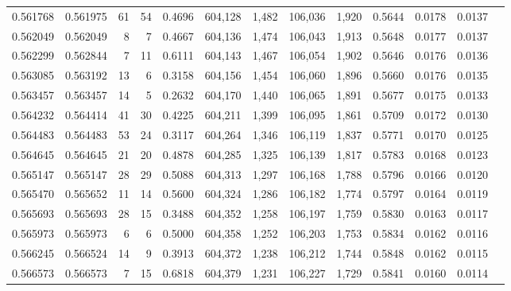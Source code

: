 \begin{tabular}{rrrrrrrrrrrrr}
0.561768 & 0.561975 &    61 &    54 &                                     0.4696 & 604,128 &   1,482 & 106,036 &   1,920 & 0.5644 & 0.0178 & 0.0137 \\
0.562049 & 0.562049 &     8 &     7 &                                     0.4667 & 604,136 &   1,474 & 106,043 &   1,913 & 0.5648 & 0.0177 & 0.0137 \\
0.562299 & 0.562844 &     7 &    11 &                                     0.6111 & 604,143 &   1,467 & 106,054 &   1,902 & 0.5646 & 0.0176 & 0.0136 \\
0.563085 & 0.563192 &    13 &     6 &                                     0.3158 & 604,156 &   1,454 & 106,060 &   1,896 & 0.5660 & 0.0176 & 0.0135 \\
0.563457 & 0.563457 &    14 &     5 &                                     0.2632 & 604,170 &   1,440 & 106,065 &   1,891 & 0.5677 & 0.0175 & 0.0133 \\
0.564232 & 0.564414 &    41 &    30 &                                     0.4225 & 604,211 &   1,399 & 106,095 &   1,861 & 0.5709 & 0.0172 & 0.0130 \\
0.564483 & 0.564483 &    53 &    24 &                                     0.3117 & 604,264 &   1,346 & 106,119 &   1,837 & 0.5771 & 0.0170 & 0.0125 \\
0.564645 & 0.564645 &    21 &    20 &                                     0.4878 & 604,285 &   1,325 & 106,139 &   1,817 & 0.5783 & 0.0168 & 0.0123 \\
0.565147 & 0.565147 &    28 &    29 &                                     0.5088 & 604,313 &   1,297 & 106,168 &   1,788 & 0.5796 & 0.0166 & 0.0120 \\
0.565470 & 0.565652 &    11 &    14 &                                     0.5600 & 604,324 &   1,286 & 106,182 &   1,774 & 0.5797 & 0.0164 & 0.0119 \\
0.565693 & 0.565693 &    28 &    15 &                                     0.3488 & 604,352 &   1,258 & 106,197 &   1,759 & 0.5830 & 0.0163 & 0.0117 \\
0.565973 & 0.565973 &     6 &     6 &                                     0.5000 & 604,358 &   1,252 & 106,203 &   1,753 & 0.5834 & 0.0162 & 0.0116 \\
0.566245 & 0.566524 &    14 &     9 &                                     0.3913 & 604,372 &   1,238 & 106,212 &   1,744 & 0.5848 & 0.0162 & 0.0115 \\
0.566573 & 0.566573 &     7 &    15 &                                     0.6818 & 604,379 &   1,231 & 106,227 &   1,729 & 0.5841 & 0.0160 & 0.0114 \\

\end{tabular}
